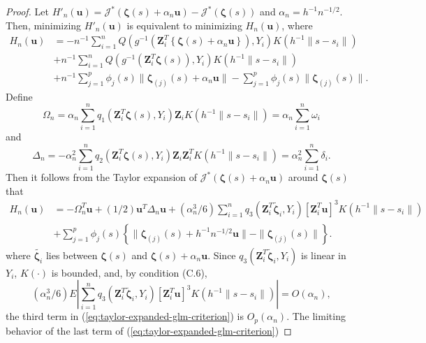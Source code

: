 \documentclass[authoryear,review, 12pt]{elsarticle}
\begin{document}
\begin{proof}
Let $H'_{n}(\bm{u})=\mathcal{J}^{*}\left(\bm{\zeta}(s)+\alpha_{n}\bm{u}\right)-\mathcal{J}^{*}\left(\bm{\zeta}(s)\right)$
and $\alpha_{n}=h^{-1}n^{-1/2}$. Then, minimizing $H'_{n}(\bm{u})$
is equivalent to minimizing $H_{n}(\bm{u})$, where 
\begin{align*}
H_{n}(\bm{u}) &= - n^{-1}\sum_{i=1}^{n}Q\left(g^{-1}\left(\bm{Z}_{i}^{T}\left\{ \bm{\zeta}(s)+\alpha_{n}\bm{u}\right\} \right),Y_{i}\right)K\left(h^{-1}\|s-s_{i}\|\right)\\
 & + n^{-1}\sum_{i=1}^{n}Q\left(g^{-1}\left(\bm{Z}_{i}^{T}\bm{\zeta}(s)\right),Y_{i}\right)K\left(h^{-1}\|s-s_{i}\|\right)\\
 & +n^{-1}\sum_{j=1}^{p}\phi_{j}\left(s\right)\|\bm{\zeta}_{(j)}(s)+\alpha_{n}\bm{u}\|-\sum_{j=1}^{p}\phi_{j}\left(s\right)\|\bm{\zeta}_{(j)}(s)\|.
\end{align*}
Define
\[
\Omega_{n}=\alpha_{n}\sum_{i=1}^{n}q_{1}\left(\bm{Z}_{i}^{T}\bm{\zeta}(s),Y_{i}\right)\bm{Z}_{i}K\left(h^{-1}\|s-s_{i}\|\right)=\alpha_{n}\sum_{i=1}^{n}\omega_{i}
\]
and 
\[
\Delta_{n}= - \alpha_{n}^{2}\sum_{i=1}^{n}q_{2}\left(\bm{Z}_{i}^{T}\bm{\zeta}(s),Y_{i}\right)\bm{Z}_{i}\bm{Z}_{i}^{T}K\left(h^{-1}\|s-s_{i}\|\right)=\alpha_{n}^{2}\sum_{i=1}^{n}\delta_{i}.
\]
Then it follows from the Taylor expansion of $\mathcal{J}^{*}\left(\bm{\zeta}(s)+\alpha_{n}\bm{u}\right)$
around $\bm{\zeta}(s)$ that
\begin{align}
H_{n}\left(\bm{u}\right) &= -\Omega_{n}^{T}\bm{u}+(1/2)\bm{u}^{T}\Delta_{n}\bm{u}+\left(\alpha_{n}^{3}/6\right)\sum_{i=1}^{n}q_{3}\left(\bm{Z}_{i}^{T}\tilde{\bm{\zeta}}_{i},Y_{i}\right)\left[\bm{Z}_{i}^{T}\bm{u}\right]^{3}K\left(h^{-1}\|s-s_{i}\|\right)\nonumber \\
 & +\sum_{j=1}^{p}\phi_{j}\left(s\right)\left\{ \|\bm{\zeta}_{(j)}(s)+h^{-1}n^{-1/2}\bm{u}\|-\|\bm{\zeta}_{(j)}(s)\|\right\} .\label{eq:taylor-expanded-glm-criterion}
\end{align}
where $\tilde{\bm{\zeta}_{i}}$ lies between $\bm{\zeta}(s)$
and $\bm{\zeta}(s)+\alpha_{n}\bm{u}$. Since $q_{3}\left(\bm{Z}_{i}^{T}\tilde{\bm{\zeta}}_{i},Y_{i}\right)$
is linear in $Y_{i}$, $K\left(\cdot\right)$ is bounded, and, by
condition (C.6),
\[
\left(\alpha_{n}^{3}/6\right)E\left|\sum_{i=1}^{n}q_{3}\left(\bm{Z}_{i}^{T}\tilde{\bm{\zeta}}_{i},Y_{i}\right)\left[\bm{Z}_{i}^{T}\bm{u}\right]^{3}K\left(h^{-1}\|s-s_{i}\|\right)\right|=O\left(\alpha_{n}\right),
\]
the third term in (\ref{eq:taylor-expanded-glm-criterion}) is $O_{p}\left(\alpha_{n}\right)$.
The limiting behavior of the last term of (\ref{eq:taylor-expanded-glm-criterion})

\end{proof}
\end{document}
